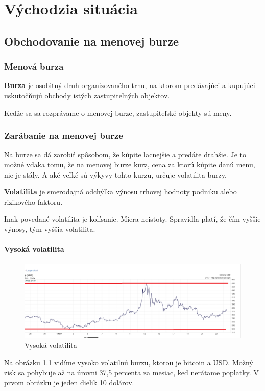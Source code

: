 
\chapter{Východzia situácia}\label{chap:intro} 
\section{Obchodovanie na menovej burze} 
\subsection{Menová burza}
\begin{mydef}
{\bf Burza} je osobitný druh organizovaného trhu, na ktorom predávajúci a kupujúci uskutočňujú obchody istých zastupiteľných objektov. 
\end{mydef}
Kedže sa sa rozprávame o menovej burze, zastupiteľské objekty sú meny. 
\subsection{Zarábanie na menovej burze} 
Na burze sa dá zarobiť spôsobom, že kúpite lacnejšie a predáte drahšie. Je to možné vďaka tomu, že na menovej burze kurz, cena za ktorú kúpite danú menu, nie je stály. A aké veľké sú výkyvy tohto kurzu, určuje volatilita burzy. 
\begin{mydef}
{\bf Volatilita}\cite{vlachy2006vrizeni} je smerodajná odchýlka výnosu trhovej hodnoty podniku alebo rizikového faktoru. 
\end{mydef}
Inak povedané volatilita je kolísanie. Miera neistoty. Spravidla platí, že čím vyššie výnosy, tým vyššia volatilita. 
\subsubsection{Vysoká volatilita} 
\begin{figure}[!hbt] 
\begin{center} 
\includegraphics[width=1\textwidth]{obr} 
\caption{Vysoká volatilita} 
\label{img:vvolat} 
\end{center} 
\end{figure} 
\begin{myex}
Na obrázku \ref{img:vvolat}  vidíme vysoko volatilnú burzu, ktorou je bitcoin a USD. Možný zisk sa pohybuje až na úrovni 37,5 percenta za mesiac, keď nerátame poplatky. V prvom obrázku je jeden dielik 10 dolárov.  
\end{myex}
